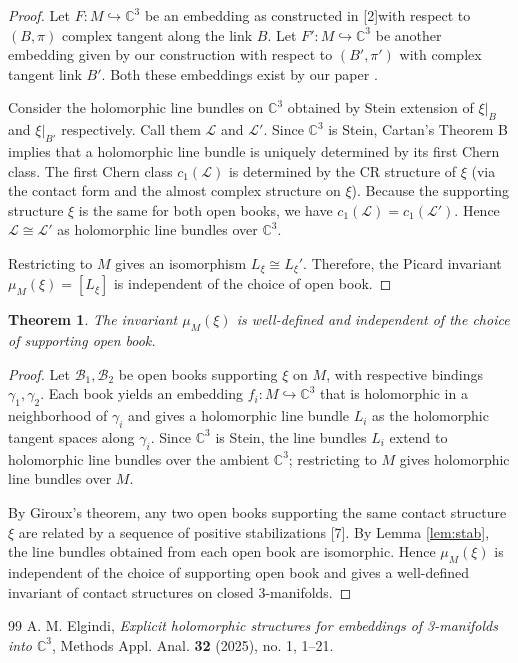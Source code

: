 \documentclass[10pt,a4paper]{amsart}
\newtheorem{theorem}{Theorem}
\newcommand{\C}{\mathbb{C}}
\begin{document}
\begin{proof}
Let $F: M \hookrightarrow \mathbb{C}^3$ be an embedding as constructed in [2]with respect to $(B,\pi)$ complex tangent along the link $B$. Let $F': M \hookrightarrow \mathbb{C}^3$ be another embedding given by our construction with respect to $(B',\pi')$ with complex tangent link $B'$. Both these embeddings exist by our paper \cite{Elgindi2025}.

Consider the holomorphic line bundles on $\mathbb{C}^3$ obtained by Stein extension of $\xi|_B$ and $\xi|_{B'}$ respectively. Call them $\mathcal{L}$ and $\mathcal{L}'$. Since $\mathbb{C}^3$ is Stein, Cartan's Theorem B implies that a holomorphic line bundle is uniquely determined by its first Chern class. The first Chern class $c_1(\mathcal{L})$ is determined by the CR structure of $\xi$ (via the contact form and the almost complex structure on $\xi$). Because the supporting structure $\xi$ is the same for both open books, we have $c_1(\mathcal{L}) = c_1(\mathcal{L}')$. Hence $\mathcal{L} \cong \mathcal{L}'$ as holomorphic line bundles over $\mathbb{C}^3$.

Restricting to $M$ gives an isomorphism $L_\xi \cong L_\xi'$. Therefore, the Picard invariant $\mu_M(\xi) = [L_\xi]$ is independent of the choice of open book.
\end{proof}


\begin{theorem}
The invariant $\mu_M(\xi)$ is well-defined and independent of the choice of supporting open book.
\end{theorem}

\begin{proof}
Let $\mathcal{B}_1, \mathcal{B}_2$ be open books supporting $\xi$ on $M$, with respective bindings $\gamma_1, \gamma_2$. Each book yields an embedding $f_i: M \hookrightarrow \C^3$ that is holomorphic in a neighborhood of $\gamma_i$ and gives a holomorphic line bundle $L_i$ as the holomorphic tangent spaces along $\gamma_i$. Since $\C^3$ is Stein, the line bundles $L_i$ extend to holomorphic line bundles over the ambient $\C^3$; restricting to $M$ gives holomorphic line bundles over $M$.

By Giroux's theorem, any two open books supporting the same contact structure $\xi$ are related by a sequence of positive stabilizations [7]. By Lemma \ref{lem:stab}, the line bundles obtained from each open book are isomorphic. Hence $\mu_M(\xi)$ is independent of the choice of supporting open book and gives a well-defined invariant of contact structures on closed 3-manifolds.
\end{proof}


\begin{thebibliography}{99}
 A. M. Elgindi, \textit{Explicit holomorphic structures for embeddings of 3-manifolds into $\C^3$}, Methods Appl. Anal. \textbf{32} (2025), no. 1, 1–21.
\end{thebibliography}
\end{document}
